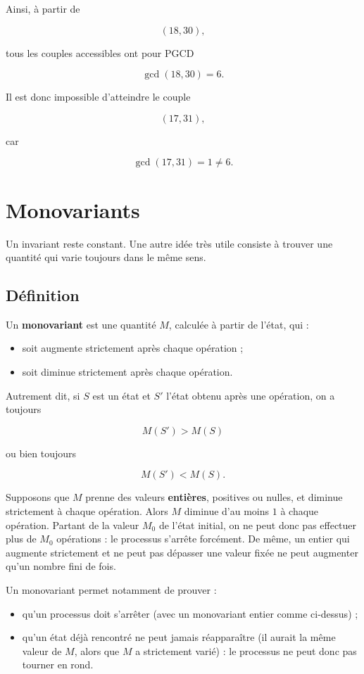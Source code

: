 Ainsi, à partir de

\[
(18,30),
\]

tous les couples accessibles ont pour PGCD

\[
\gcd(18,30)=6.
\]

Il est donc impossible d'atteindre le couple

\[
(17,31),
\]

car

\[
\gcd(17,31)=1\neq 6.
\]

\section{Monovariants}

Un invariant reste constant. Une autre idée très utile consiste à trouver une
quantité qui varie toujours dans le même sens.

\subsection{Définition}

Un \textbf{monovariant} est une quantité \(M\), calculée à partir de l'état,
qui :

\begin{itemize}
    \item soit augmente strictement après chaque opération ;
    \item soit diminue strictement après chaque opération.
\end{itemize}

Autrement dit, si \(S\) est un état et \(S'\) l'état obtenu après une
opération, on a toujours

\[
\boxed{
M(S')>M(S)
}
\]

ou bien toujours

\[
\boxed{
M(S')<M(S).
}
\]

Supposons que \(M\) prenne des valeurs \textbf{entières}, positives ou nulles,
et diminue strictement à chaque opération. Alors \(M\) diminue d'au moins
\(1\) à chaque opération. Partant de la valeur \(M_0\) de l'état initial, on
ne peut donc pas effectuer plus de \(M_0\) opérations : le processus
s'arrête forcément. De même, un entier qui augmente strictement et ne peut
pas dépasser une valeur fixée ne peut augmenter qu'un nombre fini de fois.

Un monovariant permet notamment de prouver :

\begin{itemize}
    \item qu'un processus doit s'arrêter (avec un monovariant entier comme
    ci-dessus) ;
    \item qu'un état déjà rencontré ne peut jamais réapparaître (il aurait la
    même valeur de \(M\), alors que \(M\) a strictement varié) : le processus
    ne peut donc pas tourner en rond.
\end{itemize}

